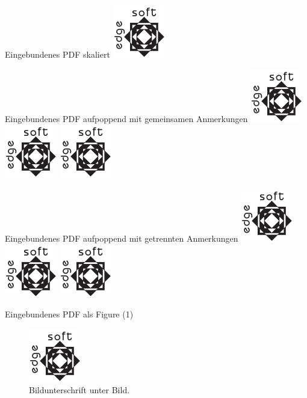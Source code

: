 \documentclass[ngerman]{scrartcl}
\begin{document}
	\begin{frame}{Eingebundenes PDF skaliert}
		\includegraphics[width=\textwidth]{testlogo}
	\end{frame}

	\begin{frame}{Eingebundenes PDF aufpoppend mit gemeinsamen Anmerkungen}
		\includegraphics<1->{testlogo}
		\includegraphics<2->{testlogo}
		\includegraphics<3->{testlogo}
	\end{frame}

	\begin{frame}{Eingebundenes PDF aufpoppend mit getrennten Anmerkungen}
		\includegraphics<1->{testlogo}
		\includegraphics<2->{testlogo}
		\includegraphics<3->{testlogo}
	\end{frame}
	\AtBeginNote{}
	\AtEndNote{}

	\begin{frame}{Eingebundenes PDF als Figure (1)}
		\begin{figure}
			\includegraphics{testlogo}
			\caption{Bildunterschrift unter Bild.}
		\end{figure}
	\end{frame}
\end{document}
